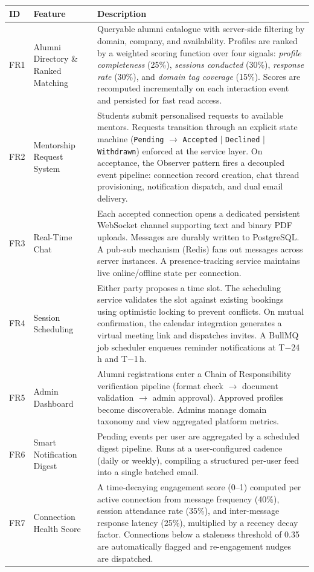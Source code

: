 \documentclass[12pt,a4paper]{article}
\begin{document}
\begin{longtable}{@{}p{1.4cm} p{3.8cm} p{7.5cm}@{}}
\toprule
\textbf{ID} & \textbf{Feature} & \textbf{Description} \\
\midrule
\endhead
FR1 & Alumni Directory \& Ranked Matching & Queryable alumni catalogue with server-side filtering by domain, company, and availability. Profiles are ranked by a weighted scoring function over four signals: \textit{profile completeness} (25\%), \textit{sessions conducted} (30\%), \textit{response rate} (30\%), and \textit{domain tag coverage} (15\%). Scores are recomputed incrementally on each interaction event and persisted for fast read access. \\[4pt]
FR2 & Mentorship Request System & Students submit personalised requests to available mentors. Requests transition through an explicit state machine (\texttt{Pending} $\to$ \texttt{Accepted} $|$ \texttt{Declined} $|$ \texttt{Withdrawn}) enforced at the service layer. On acceptance, the Observer pattern fires a decoupled event pipeline: connection record creation, chat thread provisioning, notification dispatch, and dual email delivery. \\[4pt]
FR3 & Real-Time Chat & Each accepted connection opens a dedicated persistent WebSocket channel supporting text and binary PDF uploads. Messages are durably written to PostgreSQL. A pub-sub mechanism (Redis) fans out messages across server instances. A presence-tracking service maintains live online/offline state per connection. \\[4pt]
FR4 & Session Scheduling & Either party proposes a time slot. The scheduling service validates the slot against existing bookings using optimistic locking to prevent conflicts. On mutual confirmation, the calendar integration generates a virtual meeting link and dispatches invites. A BullMQ job scheduler enqueues reminder notifications at T$-$24\,h and T$-$1\,h. \\[4pt]
FR5 & Admin Dashboard & Alumni registrations enter a Chain of Responsibility verification pipeline (format check $\to$ document validation $\to$ admin approval). Approved profiles become discoverable. Admins manage domain taxonomy and view aggregated platform metrics. \\[4pt]
FR6 & Smart Notification Digest & Pending events per user are aggregated by a scheduled digest pipeline. Runs at a user-configured cadence (daily or weekly), compiling a structured per-user feed into a single batched email. \\[4pt]
FR7 & Connection Health Score & A time-decaying engagement score (0--1) computed per active connection from message frequency (40\%), session attendance rate (35\%), and inter-message response latency (25\%), multiplied by a recency decay factor. Connections below a staleness threshold of 0.35 are automatically flagged and re-engagement nudges are dispatched. \\
\bottomrule
\end{longtable}
\end{document}
